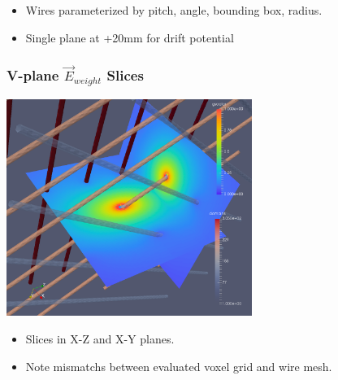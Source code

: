 \documentclass[xcolor=dvipsnames]{beamer}
\begin{document}
\begin{frame}
  \begin{itemize}
  \item Wires parameterized by pitch, angle, bounding box, radius.
  \item Single plane at +20mm for drift potential
  \end{itemize}


\end{frame}

\begin{frame}
  \frametitle{V-plane $\vec{E}_{weight}$ Slices}
  \begin{center}
    \includegraphics[width=0.6\textwidth]{cap-vweight-field-fine-slices.png}
  \end{center}

  \begin{itemize}\footnotesize
  \item Slices in X-Z and X-Y planes.
  \item Note mismatchs between evaluated voxel grid and wire mesh.
  \end{itemize}
\end{frame}
\end{document}
